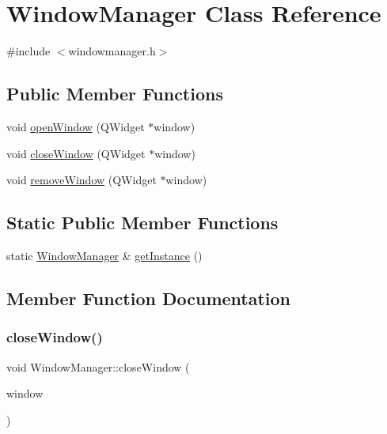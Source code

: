 \hypertarget{class_window_manager}{}\section{Window\+Manager Class Reference}
\label{class_window_manager}


{\ttfamily \#include $<$windowmanager.\+h$>$}

\subsection*{Public Member Functions}
\begin{DoxyCompactItemize}
\item 
void \mbox{\hyperlink{class_window_manager_a2dabddb740954a724f051bad50a15979}{open\+Window}} (Q\+Widget $\ast$window)
\item 
void \mbox{\hyperlink{class_window_manager_a7588564e85fafe1a1203628206f727f3}{close\+Window}} (Q\+Widget $\ast$window)
\item 
void \mbox{\hyperlink{class_window_manager_aece6fb478e72bb3c3bf33ffe6fb4ed38}{remove\+Window}} (Q\+Widget $\ast$window)
\end{DoxyCompactItemize}
\subsection*{Static Public Member Functions}
\begin{DoxyCompactItemize}
\item 
static \mbox{\hyperlink{class_window_manager}{Window\+Manager}} \& \mbox{\hyperlink{class_window_manager_a4f5e8cf13cbe4f2d80f3dbcf7f3fb2eb}{get\+Instance}} ()
\end{DoxyCompactItemize}


\subsection{Member Function Documentation}
\mbox{\label{class_window_manager_a7588564e85fafe1a1203628206f727f3}} 
\subsubsection{\texorpdfstring{close\+Window()}{closeWindow()}}
{\footnotesize\ttfamily void Window\+Manager\+::close\+Window (\begin{DoxyParamCaption}\item[{Q\+Widget $\ast$}]{window }\end{DoxyParamCaption})}

